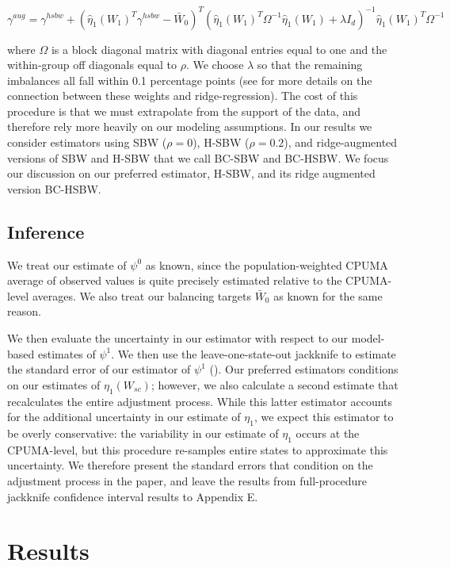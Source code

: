\documentclass[12pt]{article}
\begin{document}
$$
\gamma^{aug} = \gamma^{hsbw} + (\hat{\eta}_1(W_1)^T\gamma^{hsbw} - \bar{W}_0)^T(\hat{\eta}_1(W_1)^T\Omega^{-1}\hat{\eta}_1(W_1) + \lambda I_d)^{-1}\hat{\eta}_1(W_1)^T\Omega^{-1}
$$

where $\Omega$ is a block diagonal matrix with diagonal entries equal to one and the within-group off diagonals equal to $\rho$. We choose $\lambda$ so that the remaining imbalances all fall within 0.1 percentage points (see \cite{ben2018augmented} for more details on the connection between these weights and ridge-regression). The cost of this procedure is that we must extrapolate from the support of the data, and therefore rely more heavily on our modeling assumptions. In our results we consider estimators using SBW ($\rho = 0$), H-SBW ($\rho = 0.2$), and ridge-augmented versions of SBW and H-SBW that we call BC-SBW and BC-HSBW. We focus our discussion on our preferred estimator, H-SBW, and its ridge augmented version BC-HSBW. 

\subsection{Inference}

We treat our estimate of $\psi^0$ as known, since the population-weighted CPUMA average of observed values is quite precisely estimated relative to the CPUMA-level averages. We also treat our balancing targets $\bar{W}_0$ as known for the same reason. 

We then evaluate the uncertainty in our estimator with respect to our model-based estimates of $\psi^1$. We then use the leave-one-state-out jackknife to estimate the standard error of our estimator of $\psi^1$ (\cite{cameron2015practitioner}). Our preferred estimators conditions on our estimates of $\eta_1(W_{sc})$; however, we also calculate a second estimate that recalculates the entire adjustment process. While this latter estimator accounts for the additional uncertainty in our estimate of $\eta_1$, we expect this estimator to be overly conservative: the variability in our estimate of $\eta_1$ occurs at the CPUMA-level, but this procedure re-samples entire states to approximate this uncertainty. We therefore present the standard errors that condition on the adjustment process in the paper, and leave the results from full-procedure jackknife confidence interval results to Appendix E. 

\section{Results}
\end{document}

